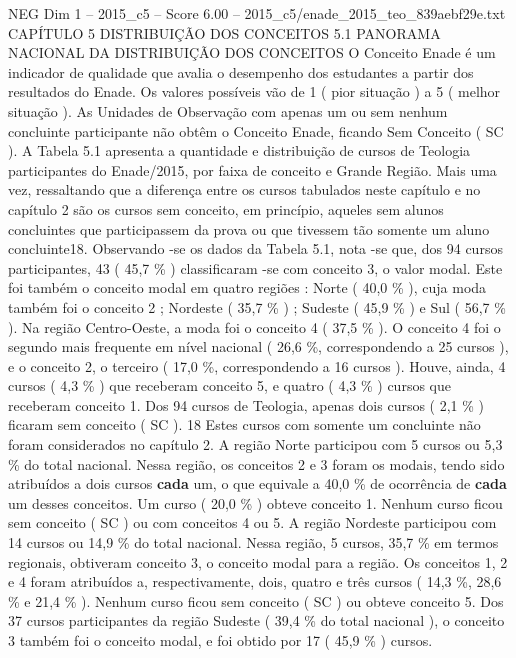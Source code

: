 \begin{textsample}{NEG Dim 1 – 2015\_c5 – Score 6.00 – 2015\_c5/enade\_2015\_teo\_839aebf29e.txt}  \label{ex:f1_neg_343}
CAPÍTULO 5 DISTRIBUIÇÃO DOS CONCEITOS 5.1 PANORAMA NACIONAL DA DISTRIBUIÇÃO DOS CONCEITOS O Conceito Enade é um indicador de qualidade que avalia o desempenho dos estudantes a partir dos resultados do Enade.
Os valores possíveis vão de 1 ( pior situação ) a 5 ( melhor situação ).
As Unidades de Observação com apenas um ou sem nenhum concluinte participante não obtêm o Conceito Enade, ficando Sem Conceito ( SC ).
A Tabela 5.1 apresenta a quantidade e distribuição de cursos de Teologia participantes do Enade/2015, por faixa de conceito e Grande Região.
Mais uma vez, ressaltando que a diferença entre os cursos tabulados neste capítulo e no capítulo 2 são os cursos sem conceito, em princípio, aqueles sem alunos concluintes que participassem da prova ou que tivessem tão somente um aluno concluinte18.
Observando -se os dados da Tabela 5.1, nota -se que, dos 94 cursos participantes, 43 ( 45,7 \% ) classificaram -se com conceito 3, o valor modal.
Este foi também o conceito modal em quatro regiões : Norte ( 40,0 \% ), cuja moda também foi o conceito 2 ; Nordeste ( 35,7 \% ) ; Sudeste ( 45,9 \% ) e Sul ( 56,7 \% ).
Na região Centro-Oeste, a moda foi o conceito 4 ( 37,5 \% ).
O conceito 4 foi o segundo mais frequente em nível nacional ( 26,6 \%, correspondendo a 25 cursos ), e o conceito 2, o terceiro ( 17,0 \%, correspondendo a 16 cursos ).
Houve, ainda, 4 cursos ( 4,3 \% ) que receberam conceito 5, e quatro ( 4,3 \% ) cursos que receberam conceito 1.
Dos 94 cursos de Teologia, apenas dois cursos ( 2,1 \% ) ficaram sem conceito ( SC ). 18 Estes cursos com somente um concluinte não foram considerados no capítulo 2.
A região Norte participou com 5 cursos ou 5,3 \% do total nacional.
Nessa região, os conceitos 2 e 3 foram os modais, tendo sido atribuídos a dois cursos \textbf{cada} um, o que equivale a 40,0 \% de ocorrência de \textbf{cada} um desses conceitos.
Um curso ( 20,0 \% ) obteve conceito 1.
Nenhum curso ficou sem conceito ( SC ) ou com conceitos 4 ou 5.
A região Nordeste participou com 14 cursos ou 14,9 \% do total nacional.
Nessa região, 5 cursos, 35,7 \% em termos regionais, obtiveram conceito 3, o conceito modal para a região.
Os conceitos 1, 2 e 4 foram atribuídos a, respectivamente, dois, quatro e três cursos ( 14,3 \%, 28,6 \% e 21,4 \% ).
Nenhum curso ficou sem conceito ( SC ) ou obteve conceito 5.
Dos 37 cursos participantes da região Sudeste ( 39,4 \% do total nacional ), o conceito 3 também foi o conceito modal, e foi obtido por 17 ( 45,9 \% ) cursos.

\end{textsample}
